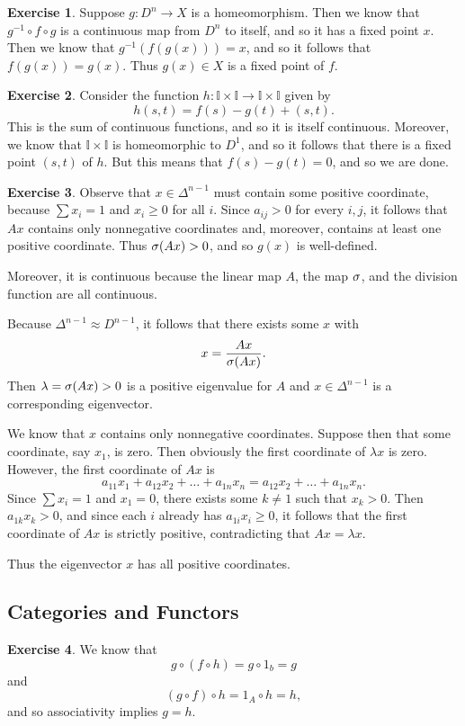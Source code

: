 \documentclass{article}
\theoremstyle{definition}
\newtheorem{intex}{Exercise}[section]
\newenvironment{exercise}{\begin{intex}\label{\theintex}}{\end{intex}}
\newcommand*\II{\mathbb I}
\begin{document}
\begin{exercise}
Suppose $g:D^n\to X$ is a homeomorphism. Then we know that $g^{-1}\circ f\circ g$ is a continuous map from $D^n$ to itself, and so it has a fixed point $x$. Then we know that $g^{-1}(f(g(x)))=x$, and so it follows that $f(g(x))=g(x)$. Thus $g(x)\in X$ is a fixed point of $f$. 
\end{exercise} 

\begin{exercise}
Consider the function $h:\II\times\II\to\II\times\II$ given by \[h(s,t)=f(s)-g(t)+(s,t).\] This is the sum of continuous functions, and so it is itself continuous. Moreover, we know that $\II\times\II$ is homeomorphic to $D^1$, and so it follows that there is a fixed point $(s,t)$ of $h$. But this means that $f(s)-g(t)=0$, and so we are done. 
\end{exercise} 

\begin{exercise}
Observe that $x\in\Delta^{n-1}$ must contain some positive coordinate, because $\sum x_i=1$ and $x_i\ge0$ for all $i$. Since $a_{ij}>0$ for every $i,j$, it follows that $Ax$ contains only nonnegative coordinates and, moreover, contains at least one positive coordinate. Thus $\sigma(Ax)>0$, and so $g(x)$ is well-defined. 

Moreover, it is continuous because the linear map $A$, the map $\sigma$, and the division function are all continuous. 

Because $\Delta^{n-1}\approx D^{n-1}$, it follows that there exists some $x$ with \[x=\frac{Ax}{\sigma(Ax)}.\] Then $\lambda=\sigma(Ax)>0$ is a positive eigenvalue for $A$ and $x\in\Delta^{n-1}$ is a corresponding eigenvector. 

We know that $x$ contains only nonnegative coordinates. Suppose then that some coordinate, say $x_1$, is zero. Then obviously the first coordinate of $\lambda x$ is zero. However, the first coordinate of $Ax$ is \[a_{11}x_1+a_{12}x_2+\dots+a_{1n}x_n=a_{12}x_2+\dots+a_{1n}x_n.\] Since $\sum x_i=1$ and $x_1=0$, there exists some $k\ne1$ such that $x_k>0$. Then $a_{1k}x_k>0$, and since each $i$ already has $a_{1i}x_i\ge0$, it follows that the first coordinate of $Ax$ is strictly positive, contradicting that $Ax=\lambda x$. 

Thus the eigenvector $x$ has all positive coordinates. 
\end{exercise} 

\subsection*{Categories and Functors} 
\begin{exercise} 
We know that \[g\circ(f\circ h)=g\circ1_b=g\] and \[(g\circ f)\circ h=1_A\circ h=h,\] and so associativity implies $g=h$. 
\end{exercise} 
\end{document}
